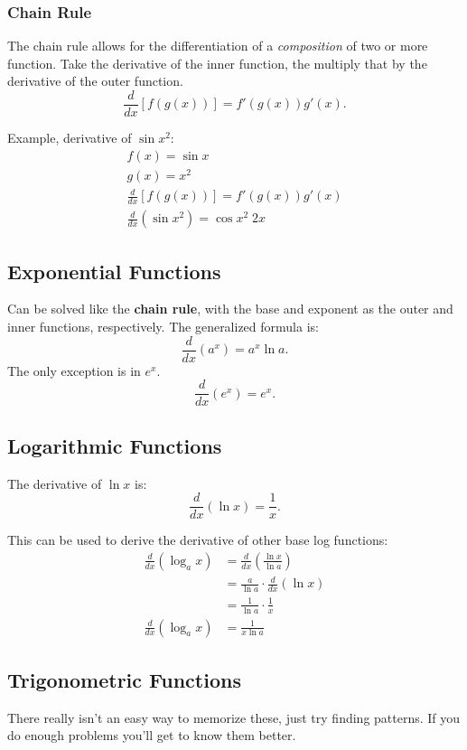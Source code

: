 \documentclass[12pt]{article}
\begin{document}
\subsubsection{Chain Rule}
The chain rule allows for the differentiation of a \textit{composition} of two or more function. Take the derivative of the inner function, the multiply that by the derivative of the outer function.
\[ \frac{d}{dx} \left[ f \left( g(x) \right) \right] = f' \left( g(x) \right) g'(x). \]

\noindent Example, derivative of $\sin{x^2}$:
\begin{gather*}
	f(x) = \sin{x} \\
	g(x) = x^2 \\
	\frac{d}{dx} \left[ f \left( g(x) \right) \right] = f' \left( g(x) \right) g'(x) \\
	\frac{d}{dx} \left( \sin{x^2} \right) = \cos{x^2} \; 2x
\end{gather*}

\subsection{Exponential Functions}
Can be solved like the \textbf{chain rule}, with the base and exponent as the outer and inner functions, respectively. The generalized formula is:
\[ \frac{d}{dx} \left( a^x \right) = a^x \ln{a}. \]
The only exception is in $e^x$.
\[ \frac{d}{dx} \left( e^x \right) = e^x.\]

\subsection{Logarithmic Functions}
\noindent The derivative of $\ln{x}$ is:
\[ \frac{d}{dx} \left( \ln{x} \right) = \frac{1}{x}. \]

\noindent This can be used to derive the derivative of other base log functions:
\begin{align*}
	\frac{d}{dx} \left( \log_a{x} \right) & = \frac{d}{dx} \left( \frac{\ln{x}}{\ln{a}} \right)         \\[6pt]
	& = \frac{a}{\ln{a}} \cdot \frac{d}{dx} \left( \ln{x} \right) \\[6pt]
	& = \frac{1}{\ln{a}} \cdot \frac{1}{x}                        \\[6pt]
	\frac{d}{dx} \left( \log_a{x} \right) & = \frac{1}{x \ln{a}}
\end{align*}

\subsection{Trigonometric Functions}
There really isn't an easy way to memorize these, just try finding patterns. If you do enough problems you'll get to know them better.
\end{document}
